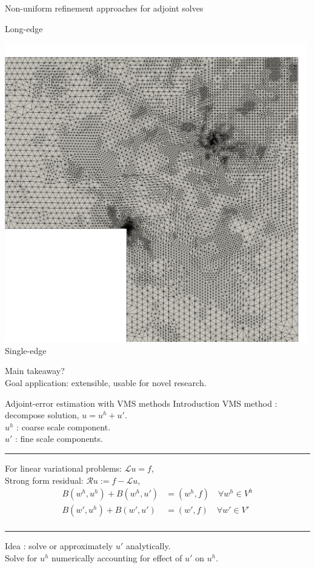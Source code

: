 \documentclass[fleqn]{beamer}
\begin{document}
\begin{frame}{Non-uniform refinement approaches for adjoint solves}
\begin{minipage}{0.33\textwidth}
Long-edge
\end{minipage}%
\begin{minipage}{0.33\textwidth}
\centering
\includegraphics[width=0.99\textwidth]{../img/refine_squarehole_long_close} \\
Single-edge
\end{minipage}

\vspace{1em}
Main takeaway? \\
Goal application: extensible, usable for novel research.
\end{frame}


\begin{frame}{Adjoint-error estimation with VMS methods}
{Introduction}
VMS method : decompose solution, $u = u^h + u'$. \\
$u^h$ : coarse scale component. \\
$u'$ : fine scale components. \\ [8pt]
\hrule
\vspace{1em}
For linear variational problems: $\mathcal{L} u  = f$, \\
Strong form residual: $\mathcal{R} u := f - \mathcal{L} u$,
%
\begin{equation*}
\begin{aligned}
B(w^h, u^h) + B(w^h, u') &= (w^h, f) \quad \forall w^h \in V^h \\
B(w', u^h) + B(w', u') &= (w', f) \quad \forall w' \in V' \\
\end{aligned}
\end{equation*}
\hrule
\vspace{1em}
Idea : solve or approximately $u'$ analytically. \\
Solve for $u^h$ numerically accounting for effect of $u'$
on $u^h.$
\end{frame}
\end{document}
